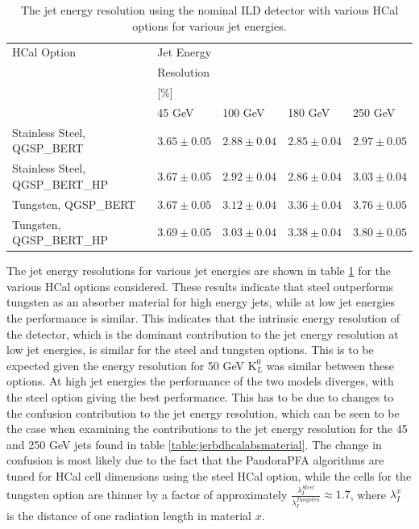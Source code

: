 
\begin{table}[h!]
\centering
\begin{tabular}{ l l l l l }
\hline
HCal Option & Jet Energy & & & \\
 & Resolution & & & \\
 & [\%] & & & \\
 & 45 GeV & 100 GeV & 180 GeV & 250 GeV \\
\hline
Stainless Steel, QGSP\_BERT & $3.65 \pm 0.05$ &$2.88 \pm 0.04$ &$2.85 \pm 0.04$ &$2.97 \pm 0.05$ \\
Stainless Steel, QGSP\_BERT\_HP & $3.67 \pm 0.05$ &$2.92 \pm 0.04$ &$2.86 \pm 0.04$ &$3.03 \pm 0.04$ \\
Tungsten, QGSP\_BERT & $3.67 \pm 0.05$ &$3.12 \pm 0.04$ &$3.36 \pm 0.04$ &$3.76 \pm 0.05$ \\
Tungsten, QGSP\_BERT\_HP & $3.69 \pm 0.05$ &$3.03 \pm 0.04$ &$3.38 \pm 0.04$ &$3.80 \pm 0.05$ \\
\hline
\end{tabular}
\caption[The jet energy resolution using the nominal ILD detector with various HCal options for various jet energies.]{The jet energy resolution using the nominal ILD detector with various HCal options for various jet energies.}
\label{table:jerhcalabsmaterial}
\end{table}

The jet energy resolutions for various jet energies are shown in table \ref{table:jerhcalabsmaterial} for the various HCal options considered.  These results indicate that steel outperforms tungsten as an absorber material for high energy jets, while at low jet energies the performance is similar.  This indicates that the intrinsic energy resolution of the detector, which is the dominant contribution to the jet energy resolution at low jet energies, is similar for the steel and tungsten options.  This is to be expected given the energy resolution for 50 GeV $\text{K}^{0}_{L}$ was similar between these options.  At high jet energies the performance of the two models diverges, with the steel option giving the best performance.  This has to be due to changes to the confusion contribution to the jet energy resolution, which can be seen to be the case when examining the contributions to the jet energy resolution for the 45 and 250 GeV jets found in table \ref{table:jerbdhcalabsmaterial}.  The change in confusion is most likely due to the fact that the PandoraPFA algorithms are tuned for HCal cell dimensions using the steel HCal option, while the cells for the tungsten option are thinner by a factor of approximately $\frac{\lambda_{I}^{Steel}}{\lambda_{I}^{Tungsten}} \approx 1.7$, where $\lambda_{I}^{x}$ is the distance of one radiation length in material $x$.  

